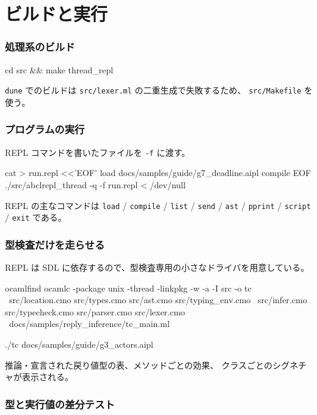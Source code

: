 \documentclass[11pt,a4paper]{ltjsarticle}
\begin{document}
\part{ビルドと実行}
\label{part:tool}

\section{処理系のビルド}

\begin{term}
cd src && make thread_repl
\end{term}

\texttt{dune} でのビルドは \texttt{src/lexer.ml} の二重生成で失敗するため、
\texttt{src/Makefile} を使う。

\section{プログラムの実行}

REPL コマンドを書いたファイルを \texttt{-f} に渡す。

\begin{term}
cat > run.repl <<'EOF'
load docs/samples/guide/g7_deadline.aipl
compile
EOF
./src/abclrepl_thread -q -f run.repl < /dev/null
\end{term}

REPL の主なコマンドは
\texttt{load} / \texttt{compile} / \texttt{list} / \texttt{send} /
\texttt{ast} / \texttt{pprint} / \texttt{script} / \texttt{exit} である。

\section{型検査だけを走らせる}
\label{sec:tc}

REPL は SDL に依存するので、型検査専用の小さなドライバを用意している。

\begin{term}
ocamlfind ocamlc -package unix -thread -linkpkg -w -a -I src -o tc \
  src/location.cmo src/types.cmo src/ast.cmo src/typing_env.cmo \
  src/infer.cmo src/typecheck.cmo src/parser.cmo src/lexer.cmo \
  docs/samples/reply_inference/tc_main.ml

./tc docs/samples/guide/g3_actors.aipl
\end{term}

推論・宣言された戻り値型の表、メソッドごとの効果、
クラスごとのシグネチャが表示される。

\section{型と実行値の差分テスト}
\end{document}
